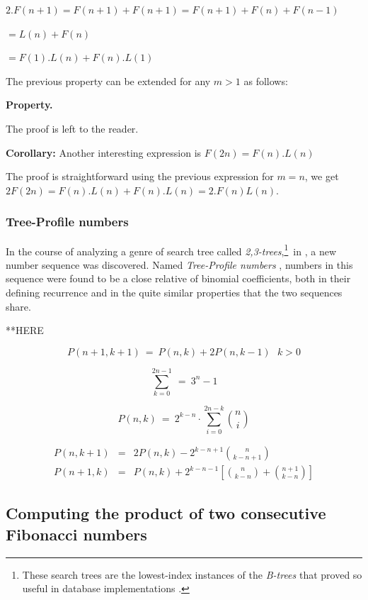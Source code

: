 $2.F(n+1) = F(n+1) +  F(n+1) =  F(n+1) + F(n) + F(n-1)$

$= L(n) + F(n) $

$= F(1).L(n) + F(n).L(1)$
\medskip


The previous property can be extended for any $m>1$ as follows:

\noindent \textbf{Property. } 
\label{prop:Lucas3}


The proof is left to the reader.

\bigskip

\noindent \textbf{Corollary:} Another interesting expression is
$F(2n) = F(n).L(n)$

The proof is straightforward using the previous expression for $m=n$, we get $2F(2n) = F(n).L(n) + F(n).L(n) = 2.F(n)L(n)$.


\subsubsection{Tree-Profile numbers}
\label{sec:Tree-Profile-numbers}

In the course of analyzing a genre of search tree called {\it
  2,3-trees},\footnote{These search trees are the lowest-index
  instances of the {\it B-trees} that proved so useful in database
  implementations \cite{CLRS}.}~in \cite{MillerPRS79,RosenbergS78}, a
new number sequence was discovered.  Named {\it Tree-Profile numbers}
\cite{Rosenberg79}, numbers in this sequence were found to be a close
relative of binomial coefficients, both in their defining recurrence
and in the quite similar properties that the two sequences share.



**HERE

\[ P(n+1, k+1) \ = \ P(n,k) + 2 P(n, k-1) \ \ \ k>0 \]

\[ \sum_{k=0}^{2n-1} \ = \ 3^n -1 \]

\[ P(n,k) \ = \ 2^{k-n} \cdot \sum_{i=0}^{2n-k} {n \choose i} \]


\begin{eqnarray*}
P(n, k+1) & = & 
  2 P(n,k) - 2^{k-n+1} {n \choose {k-n+1}} \\
P(n+1, k) & = &
  P(n,k) + 2^{k-n-1} \left[ {n \choose {k-n}} + {{n+1} \choose {k-n}} \right]
\end{eqnarray*}



 


\subsection{Computing the product of two consecutive Fibonacci numbers}

